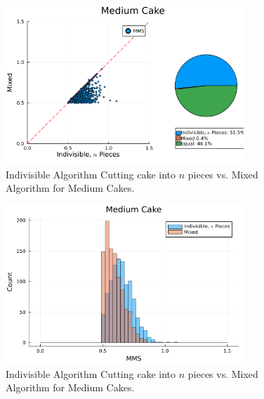 \begin{figure}
    \centering
    \includegraphics[width=0.8\textwidth]{assets/plots/scatter_indivisible_n_pieces_vs_mixed_medium_cake.png}
    \caption{Indivisible Algorithm Cutting cake into $n$ pieces vs. Mixed Algorithm for Medium Cakes.}
    \label{fig:scatter_indivisible_n_pieces_vs_mixed_medium_cake}
\end{figure}
\begin{figure}
    \centering
    \includegraphics[width=0.8\textwidth]{assets/plots/histogram_indivisible_n_pieces_vs_mixed_medium_cake.png}
    \caption{Indivisible Algorithm Cutting cake into $n$ pieces vs. Mixed Algorithm for Medium Cakes.}
    \label{fig:histogram_indivisible_n_pieces_vs_mixed_medium_cake}
\end{figure}

